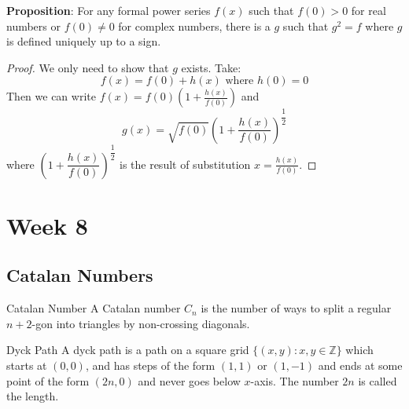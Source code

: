 \documentclass{report}
\begin{document}
\textbf{Proposition}: For any formal power series $f(x)$ such that $f(0) > 0$ for real numbers or $f(0) \neq 0$ for complex numbers, there is a $g$ such that $g^{2} = f$ where $g$ is defined uniquely up to a sign.
    \begin{proof}
        We only need to show that $g$ exists. Take:
            \begin{equation*}
                f(x) = f(0) + h(x) \text{ where $h(0) = 0$}
            \end{equation*}
        Then we can write $f(x) = f(0)(1 + \frac{h(x)}{f(0)})$ and 
            \begin{equation*}
                g(x) = \sqrt{f(0)}\boxed{\left(1 + \dfrac{h(x)}{f(0)}\right)^{\dfrac{1}{2}}}
            \end{equation*}
        where $\boxed{\left(1 + \dfrac{h(x)}{f(0)}\right)^{\dfrac{1}{2}}}$ is the result of substitution $x = \frac{h(x)}{f(0)}$.
    \end{proof}

\chapter{Week 8}

\begin{topic}
    \section{Catalan Numbers}
\end{topic}

\begin{definition}{Catalan Number}
    A Catalan number $C_{n}$ is the number of ways to split a regular $n + 2$-gon into triangles by non-crossing diagonals.
\end{definition}

\begin{definition}{Dyck Path}
    A dyck path is a path on a square grid $\{(x, y) : x, y \in \mathbb{Z}\}$ which starts at $(0, 0)$, and has steps of the form $(1, 1)$ or $(1, -1)$ and ends at some point of the form $(2n, 0)$ and never goes below $x$-axis. The number $2n$ is called the length.
\end{definition}
\end{document}
